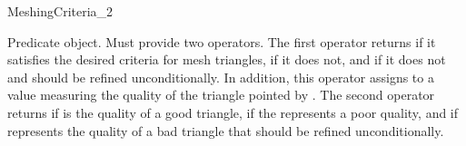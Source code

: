 \begin{ccRefConcept}{MeshingCriteria_2}

 {Predicate object. Must provide two operators. The
  first operator  returns  if it satisfies the desired criteria
  for mesh triangles,  if it does not, and 
  if it does not and should be refined unconditionally. In addition, this
  operator assigns to  a value measuring the quality of the triangle
  pointed by . The second operator  returns  if  is the quality
  of a good triangle,  if the  represents a poor quality,
  and  if  represents the quality of a bad
  triangle that should be refined unconditionally.}




\ccHasModels
{}\\

\end{ccRefConcept}

